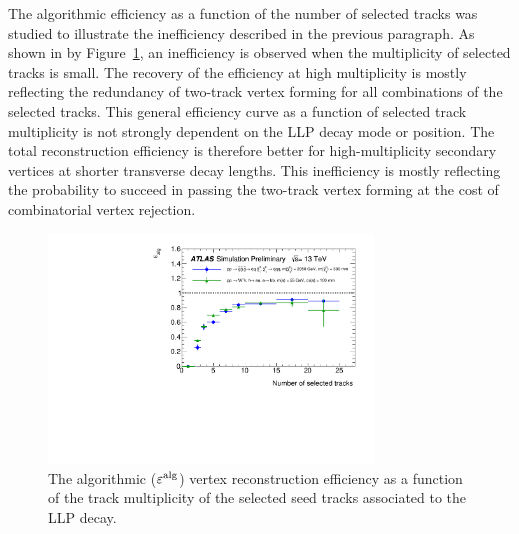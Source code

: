 \documentclass[PUB,UKenglish, texlive=2018]{\ATLASLATEXPATH atlasdoc}
\begin{document}
The algorithmic efficiency as a function of the number of selected tracks was studied to illustrate the inefficiency described in the previous paragraph.
As shown in  by Figure~\ref{fig:effMult}, an inefficiency is observed when the multiplicity of selected tracks is small.
The recovery of the efficiency at high multiplicity is mostly reflecting the redundancy of two-track vertex forming for all combinations of the selected tracks. 
This general efficiency curve as a function of selected track multiplicity is not strongly dependent on the LLP decay mode or position. 
The total reconstruction efficiency is therefore better for high-multiplicity secondary vertices at shorter transverse decay lengths.
This inefficiency is mostly reflecting the probability to succeed in passing the two-track vertex forming at the cost of combinatorial vertex rejection. 

\begin{figure}[h]
\begin{center}
\includegraphics[width=0.77\textwidth]{figures/final/eff_ntrk_alg.pdf}
\caption{The algorithmic ($\varepsilon^{\rm alg}$) vertex reconstruction efficiency as a function of the track multiplicity of the selected seed tracks associated to the LLP decay.}
\label{fig:effMult}
\end{center}
\end{figure}
\end{document}
